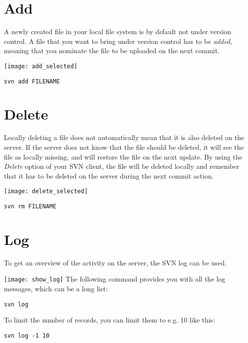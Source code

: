 \section{Add}
A newly created file in your local file system is by default not under version control. A file that you want to bring under version control has to be \emph{added}, meaning that you nominate the file to be uploaded on the next commit. 

\begin{multicols}{2}
\texttt{[image: add\_selected]}
\columnbreak
\begin{verbatim}
svn add FILENAME
\end{verbatim}

\end{multicols}
\newpage

\section{Delete}
Locally deleting a file does not automatically mean that it is also deleted on the server. If the server does not know that the file should be deleted, it will see the file as locally missing, and will restore the file on the next update. By using the \emph{Delete} option of your SVN client, the file will be deleted locally and remember that it has to be deleted on the server during the next commit action. 

\begin{multicols}{2}
\texttt{[image: delete\_selected]}
\columnbreak
\begin{verbatim}
svn rm FILENAME
\end{verbatim}

\end{multicols}

\section{Log}
To get an overview of the activity on the server, the SVN log can be used. 

\begin{multicols}{2}
\texttt{[image: show\_log]}
\columnbreak
\newline The following command provides you with all the log messages, which can be a long list: 
\begin{verbatim}
svn log
\end{verbatim}
To limit the number of records, you can limit them to e.g. 10 like this:
\begin{verbatim}
svn log -1 10
\end{verbatim}
\end{multicols}
